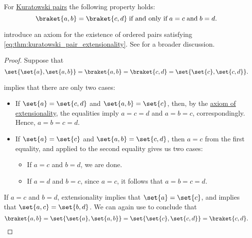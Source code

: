 \begin{proposition}\label{thm:kuratowski_pair_extensionality}
  For \hyperref[def:kuratowski_pair]{Kuratowski pairs} the following property holds:
  \begin{equation}\label{eq:thm:kuratowski_pair_extensionality}
    \braket{ a, b } = \braket{ c, d } \T{if and only if} a = c \T{and} b = d.
  \end{equation}
\end{proposition}
\begin{comments}
  \item {} introduce an axiom for the existence of ordered pairs satisfying \eqref{eq:thm:kuratowski_pair_extensionality}. See  for a broader discussion.
\end{comments}
\begin{proof}
  \SufficiencySubProof Suppose that
  \begin{equation*}
    \set{ \set{ a }, \set{ a, b } }
    =
    \braket{ a, b }
    =
    \braket{ c, d }
    =
    \set{ \set{ c }, \set{ c, d } }.
  \end{equation*}

   implies that there are only two cases:
  \begin{itemize}
    \item If \( \set{ a } = \set{ c, d } \) and \( \set{ a, b } = \set{ c } \), then, by the \hyperref[def:naive_set_theory/extensionality]{axiom of extensionality}, the equalities imply \( a = c = d \) and \( a = b = c \), correspondingly. Hence, \( a = b = c = d \).

    \item If \( \set{ a } = \set{ c } \) and \( \set{ a, b } = \set{ c, d } \), then \( a = c \) from the first equality, and  applied to the second equality gives us two cases:
    \begin{itemize}
      \item If \( a = c \) and \( b = d \), we are done.
      \item If \( a = d \) and \( b = c \), since \( a = c \), it follows that \( a = b = c = d \).
    \end{itemize}
  \end{itemize}

  \NecessitySubProof If \( a = c \) and \( b = d \), extensionality implies that \( \set{ a } = \set{ c } \), and  implies that \( \set{ a, c } = \set{ b, d } \). We can again use  to conclude that
  \begin{equation*}
    \braket{ a, b }
    =
    \set{ \set{ a }, \set{ a, b } }
    =
    \set{ \set{ c }, \set{ c, d } }
    =
    \braket{ c, d }.
  \end{equation*}
\end{proof}

